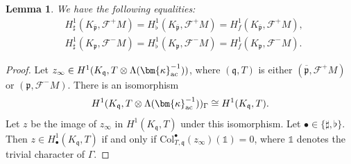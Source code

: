 \documentclass{amsart}
\numberwithin{equation}{section}
\newtheorem{lemma}[theorem]{Lemma}
\newcommand{\frk}{\mathfrak}
\newcommand{\fp}{\mathfrak{p}}
\newcommand{\fq}{\mathfrak{q}}
\newcommand{\col}{\mathrm{Col}}
\newcommand{\ac}{\textup{ac}}
\newcommand{\bk}{(\bm{\kappa}_{\ac}^{-1})}
\newcommand{\sF}{\mathscr{F}}
\begin{document}
\begin{lemma}
    We have the following equalities:
    \begin{align*}
        & H^1_\sharp(K_{\overline{\frk{p}}},\mathscr{F}^+M)=H^1_\flat(K_{\overline{\frk{p}}},\mathscr{F}^+M)=H^1_f(K_{\overline{\frk{p}}},\mathscr{F}^+M), \\
        & H^1_\sharp(K_{\frk{p}},\mathscr{F}^-M)=H^1_\flat(K_{\frk{p}},\mathscr{F}^-M)=H^1_f(K_{\frk{p}},\mathscr{F}^-M).
    \end{align*}
\end{lemma}
\begin{proof}
Let $z_\infty\in H^1(K_\fq,T\otimes\Lambda\bk)$, where $(\fq,T)$ is either $(\overline{\fp},\sF^+M)$ or $(\fp,\sF^-M)$. There is an isomorphism
\[
H^1(K_\fq,T\otimes\Lambda\bk)_\Gamma\cong H^1(K_\fq,T).
\]
Let $z$ be the image of $z_\infty$ in $H^1(K_\fq,T)$ under this isomorphism.
Let $\bullet\in\{\sharp,\flat\}$. Then $z\in H^1_\bullet(K_\fq,T)$ if and only if $\col^\bullet_{T,\fq}(z_\infty)(\mathbb{1})=0$, where $\mathbb{1}$ denotes the trivial character of $\Gamma$.


\end{proof}
\end{document}
